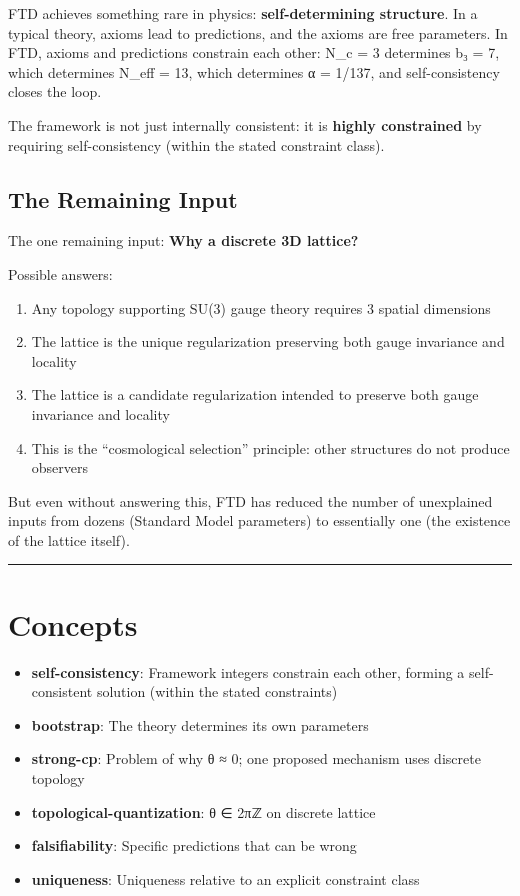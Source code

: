 \documentclass[
  11pt,
  letterpaper,
  twoside,
  openany]{book}
\makeatletter
\providecommand{\tightlist}{%
  \setlength{\itemsep}{0pt}\setlength{\parskip}{0pt}}
\let\orig@section\section
\renewcommand{\section}{\needspace{8\baselineskip}\orig@section}
\let\orig@subsection\subsection
\renewcommand{\subsection}{\needspace{6\baselineskip}\orig@subsection}
\makeatother
\begin{document}
FTD achieves something rare in physics: \textbf{self-determining
structure}. In a typical theory, axioms lead to predictions, and the
axioms are free parameters. In FTD, axioms and predictions constrain
each other: N\_c = 3 determines b₃ = 7, which determines N\_eff = 13,
which determines α = 1/137, and self-consistency closes the loop.

The framework is not just internally consistent: it is \textbf{highly
constrained} by requiring self-consistency (within the stated constraint
class).

\subsection{The Remaining Input}\label{the-remaining-input}

The one remaining input: \textbf{Why a discrete 3D lattice?}

Possible answers:

\begin{enumerate}
\def\labelenumi{\arabic{enumi}.}
\tightlist
\item
  Any topology supporting SU(3) gauge theory requires 3 spatial
  dimensions
\item
  The lattice is the unique regularization preserving both gauge
  invariance and locality
\item
  The lattice is a candidate regularization intended to preserve both
  gauge invariance and locality
\item
  This is the ``cosmological selection'' principle: other structures do
  not produce observers
\end{enumerate}

But even without answering this, FTD has reduced the number of
unexplained inputs from dozens (Standard Model parameters) to
essentially one (the existence of the lattice itself).

\begin{center}\rule{0.5\linewidth}{0.5pt}\end{center}

\section{Concepts}\label{concepts}

\begin{itemize}
\tightlist
\item
  \textbf{self-consistency}: Framework integers constrain each other,
  forming a self-consistent solution (within the stated constraints)
\item
  \textbf{bootstrap}: The theory determines its own parameters
\item
  \textbf{strong-cp}: Problem of why θ ≈ 0; one proposed mechanism uses
  discrete topology
\item
  \textbf{topological-quantization}: θ ∈ 2πℤ on discrete lattice
\item
  \textbf{falsifiability}: Specific predictions that can be wrong
\item
  \textbf{uniqueness}: Uniqueness relative to an explicit constraint
  class
\end{itemize}
\end{document}
